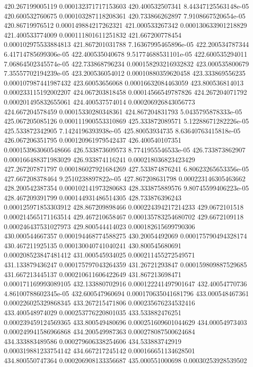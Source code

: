 {420.267199005119 0.000132371717153603
420.400532507341 8.44347125563148e-05
420.600532760675 0.000103287118208361
420.733866262897 7.9108667520654e-05
420.86719976512 0.000149884217262321
421.000533267342 0.000130633901218829
421.400533774009 0.000111801611251832
421.667200778454 0.000102975533884813
421.867201031788 7.16367995465896e-05
422.200534787344 6.41714785699306e-05
422.400535040678 9.51774688531101e-05
422.600535294011 7.06864502345574e-05
422.733868796234 0.000158293216932832
423.000535800679 7.35557702194239e-05
423.200536054012 0.00010880359620458
423.333869556235 0.000107987441987432
423.60053656068 0.00016632084463059
423.800536814013 0.000233115192002207
424.067203818458 0.00014566549787826
424.267204071792 0.000201495832655061
424.400537574014 0.000206926843056773
424.667204578459 0.00015330280348361
424.867204831793 5.0435795878333e-05
425.067205085126 0.000111900553310869
425.333872089571 5.12288671282226e-05
425.533872342905 7.1424196393938e-05
425.80053934735 8.63640763415818e-05
426.067206351795 0.000120961979542437
426.400540107351 0.000153963060548666
426.533873609573 8.7741955546533e-05
426.733873862907 0.000166488371983029
426.933874116241 0.000218036823423429
427.267207871797 0.000186027921684269
427.533874876241 6.80623265653356e-05
427.667208378464 9.2510238897822e-05
427.867208631798 0.000223146305463662
428.200542387354 0.000102141973280683
428.333875889576 9.80745599406223e-05
428.467209391799 0.000144931486514305
428.733876396243 0.000125971853303912
428.867209898466 0.000224394217214233
429.0672101518 0.000214565171163514
429.467210658467 0.000135783254680702
429.6672109118 0.000246437531027973
429.800544414023 0.000182615699790306
430.000544667357 0.000194468774588275
430.20054492069 0.000175790494328174
430.467211925135 0.000130040741040241
430.800545680691 0.000208523847481412
431.000545934025 0.000211455272549571
431.133879436247 0.000175797043264359
431.26721293847 0.000159809887529685
431.667213445137 0.000210611606422649
431.867213698471 0.000171169993089105
432.133880702916 0.000122241497901647
432.40054770736 4.86100788602345e-05
432.600547960694 0.000170635041681796
433.000548467361 0.000226025329868345
433.267215471806 0.000235676234532416
433.400548974029 0.000253776220801035
433.533882476251 0.000239459124569365
433.800549480696 0.000251609601044629
434.00054973403 0.000249941586966868
434.200549987363 0.000278087500624684
434.333883489586 0.000279606338254606
434.533883742919 0.000319881233754142
434.667217245142 0.000166651134628501
434.800550747364 0.000206908133356687
435.000551000698 0.00030253928539502
}

